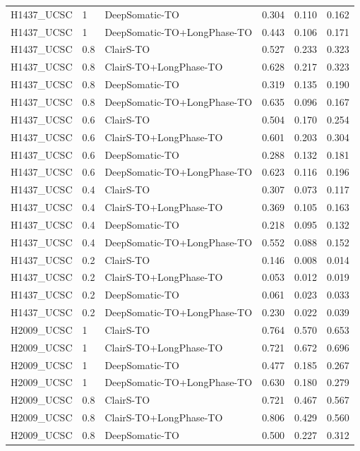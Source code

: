 \documentclass[pdflatex,sn-nature]{sn-jnl}
\begin{document}
{\begin{longtable}{@{}lllccc@{}}
  H1437\_UCSC & 1 & DeepSomatic-TO & 0.304 & 0.110 & 0.162 \\
  H1437\_UCSC & 1 & DeepSomatic-TO+LongPhase-TO & 0.443 & 0.106 & 0.171 \\
  H1437\_UCSC & 0.8 & ClairS-TO & 0.527 & 0.233 & 0.323 \\
  H1437\_UCSC & 0.8 & ClairS-TO+LongPhase-TO & 0.628 & 0.217 & 0.323 \\
  H1437\_UCSC & 0.8 & DeepSomatic-TO & 0.319 & 0.135 & 0.190 \\
  H1437\_UCSC & 0.8 & DeepSomatic-TO+LongPhase-TO & 0.635 & 0.096 & 0.167 \\
  H1437\_UCSC & 0.6 & ClairS-TO & 0.504 & 0.170 & 0.254 \\
  H1437\_UCSC & 0.6 & ClairS-TO+LongPhase-TO & 0.601 & 0.203 & 0.304 \\
  H1437\_UCSC & 0.6 & DeepSomatic-TO & 0.288 & 0.132 & 0.181 \\
  H1437\_UCSC & 0.6 & DeepSomatic-TO+LongPhase-TO & 0.623 & 0.116 & 0.196 \\
  H1437\_UCSC & 0.4 & ClairS-TO & 0.307 & 0.073 & 0.117 \\
  H1437\_UCSC & 0.4 & ClairS-TO+LongPhase-TO & 0.369 & 0.105 & 0.163 \\
  H1437\_UCSC & 0.4 & DeepSomatic-TO & 0.218 & 0.095 & 0.132 \\
  H1437\_UCSC & 0.4 & DeepSomatic-TO+LongPhase-TO & 0.552 & 0.088 & 0.152 \\
  H1437\_UCSC & 0.2 & ClairS-TO & 0.146 & 0.008 & 0.014 \\
  H1437\_UCSC & 0.2 & ClairS-TO+LongPhase-TO & 0.053 & 0.012 & 0.019 \\
  H1437\_UCSC & 0.2 & DeepSomatic-TO & 0.061 & 0.023 & 0.033 \\
  H1437\_UCSC & 0.2 & DeepSomatic-TO+LongPhase-TO & 0.230 & 0.022 & 0.039 \\
  H2009\_UCSC & 1 & ClairS-TO & 0.764 & 0.570 & 0.653 \\
  H2009\_UCSC & 1 & ClairS-TO+LongPhase-TO & 0.721 & 0.672 & 0.696 \\
  H2009\_UCSC & 1 & DeepSomatic-TO & 0.477 & 0.185 & 0.267 \\
  H2009\_UCSC & 1 & DeepSomatic-TO+LongPhase-TO & 0.630 & 0.180 & 0.279 \\
  H2009\_UCSC & 0.8 & ClairS-TO & 0.721 & 0.467 & 0.567 \\
  H2009\_UCSC & 0.8 & ClairS-TO+LongPhase-TO & 0.806 & 0.429 & 0.560 \\
  H2009\_UCSC & 0.8 & DeepSomatic-TO & 0.500 & 0.227 & 0.312 \\

\end{longtable}}
\end{document}
